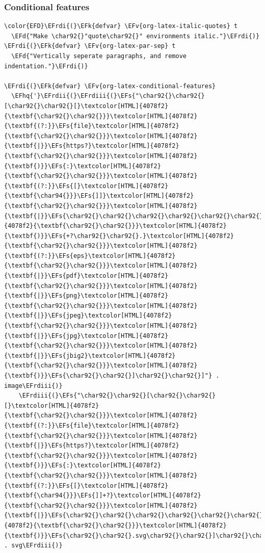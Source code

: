 \documentclass{scrartcl}
\newcommand{\EFk}[1]{\textcolor{EFk}{#1}} %
\newcommand{\EFd}[1]{\textcolor{EFd}{\textit{#1}}} %
\newcommand{\EFs}[1]{\textcolor{EFs}{#1}} %
\newcommand{\EFv}[1]{\textcolor{EFv}{#1}} %
\newcommand{\EFhq}[1]{\textcolor{EFhq}{#1}} %
\newcommand{\EFrdi}[1]{\textcolor{EFrdi}{#1}} %
\newcommand{\EFrdii}[1]{\textcolor{EFrdii}{#1}} %
\newcommand{\EFrdiii}[1]{\textcolor{EFrdiii}{#1}} %
\begin{document}
\subsubsection{Conditional features}
\label{sec:org3aba88c}
\begin{Code}
\begin{Verbatim}[]
\color{EFD}\EFrdi{(}\EFk{defvar} \EFv{org-latex-italic-quotes} t
  \EFd{"Make \char92{}"quote\char92{}" environments italic."}\EFrdi{)}
\EFrdi{(}\EFk{defvar} \EFv{org-latex-par-sep} t
  \EFd{"Vertically seperate paragraphs, and remove indentation."}\EFrdi{)}

\EFrdi{(}\EFk{defvar} \EFv{org-latex-conditional-features}
  \EFhq{'}\EFrdii{(}\EFrdiii{(}\EFs{"\char92{}\char92{}[\char92{}\char92{}[}\textcolor[HTML]{4078f2}{\textbf{\char92{}\char92{}}}\textcolor[HTML]{4078f2}{\textbf{(?:}}\EFs{file}\textcolor[HTML]{4078f2}{\textbf{\char92{}\char92{}}}\textcolor[HTML]{4078f2}{\textbf{|}}\EFs{https?}\textcolor[HTML]{4078f2}{\textbf{\char92{}\char92{}}}\textcolor[HTML]{4078f2}{\textbf{)}}\EFs{:}\textcolor[HTML]{4078f2}{\textbf{\char92{}\char92{}}}\textcolor[HTML]{4078f2}{\textbf{(?:}}\EFs{[}\textcolor[HTML]{4078f2}{\textbf{\char94{}}}\EFs{]]}\textcolor[HTML]{4078f2}{\textbf{\char92{}\char92{}}}\textcolor[HTML]{4078f2}{\textbf{|}}\EFs{\char92{}\char92{}\char92{}\char92{}\char92{}\char92{}]}\textcolor[HTML]{4078f2}{\textbf{\char92{}\char92{}}}\textcolor[HTML]{4078f2}{\textbf{)}}\EFs{+?\char92{}\char92{}.}\textcolor[HTML]{4078f2}{\textbf{\char92{}\char92{}}}\textcolor[HTML]{4078f2}{\textbf{(?:}}\EFs{eps}\textcolor[HTML]{4078f2}{\textbf{\char92{}\char92{}}}\textcolor[HTML]{4078f2}{\textbf{|}}\EFs{pdf}\textcolor[HTML]{4078f2}{\textbf{\char92{}\char92{}}}\textcolor[HTML]{4078f2}{\textbf{|}}\EFs{png}\textcolor[HTML]{4078f2}{\textbf{\char92{}\char92{}}}\textcolor[HTML]{4078f2}{\textbf{|}}\EFs{jpeg}\textcolor[HTML]{4078f2}{\textbf{\char92{}\char92{}}}\textcolor[HTML]{4078f2}{\textbf{|}}\EFs{jpg}\textcolor[HTML]{4078f2}{\textbf{\char92{}\char92{}}}\textcolor[HTML]{4078f2}{\textbf{|}}\EFs{jbig2}\textcolor[HTML]{4078f2}{\textbf{\char92{}\char92{}}}\textcolor[HTML]{4078f2}{\textbf{)}}\EFs{\char92{}\char92{}]\char92{}\char92{}]"} . image\EFrdiii{)}
    \EFrdiii{(}\EFs{"\char92{}\char92{}[\char92{}\char92{}[}\textcolor[HTML]{4078f2}{\textbf{\char92{}\char92{}}}\textcolor[HTML]{4078f2}{\textbf{(?:}}\EFs{file}\textcolor[HTML]{4078f2}{\textbf{\char92{}\char92{}}}\textcolor[HTML]{4078f2}{\textbf{|}}\EFs{https?}\textcolor[HTML]{4078f2}{\textbf{\char92{}\char92{}}}\textcolor[HTML]{4078f2}{\textbf{)}}\EFs{:}\textcolor[HTML]{4078f2}{\textbf{\char92{}\char92{}}}\textcolor[HTML]{4078f2}{\textbf{(?:}}\EFs{[}\textcolor[HTML]{4078f2}{\textbf{\char94{}}}\EFs{]]+?}\textcolor[HTML]{4078f2}{\textbf{\char92{}\char92{}}}\textcolor[HTML]{4078f2}{\textbf{|}}\EFs{\char92{}\char92{}\char92{}\char92{}\char92{}\char92{}]}\textcolor[HTML]{4078f2}{\textbf{\char92{}\char92{}}}\textcolor[HTML]{4078f2}{\textbf{)}}\EFs{\char92{}\char92{}.svg\char92{}\char92{}]\char92{}\char92{}]"} . svg\EFrdiii{)}

\end{Verbatim}
\end{Code}
\end{document}
